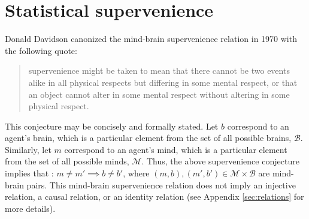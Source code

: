 \documentclass{article}
\newcommand{\mB}{\mathcal{B}}
\newcommand{\mM}{\mathcal{M}}
\providecommand{\mc}[1]{\mathcal{#1}}
\begin{document}


\section{Statistical supervenience} %
\label{sec:preliminaries}



Donald Davidson canonized the mind-brain supervenience relation in 1970 with the following quote: \cite{Davidson70}
\begin{quotation}
\noindent supervenience might be taken to mean that there cannot be two events alike in all physical respects but differing in some mental respect, or that an object cannot alter in some mental respect without altering in some physical respect.
\end{quotation}
This conjecture may be concisely and formally stated.  Let $b$ correspond to an agent's brain, which is a particular element from the set of all possible brains, $\mB$. %
Similarly, let $m$ correspond to an agent's mind, which is a particular element from the set of all possible minds, $\mM$.  %
Thus, the above supervenience conjecture implies that%
: $m \neq m' \implies b \neq b'$, where $(m,b), (m',b') \in \mc{M} \times \mc{B}$ are mind-brain pairs.  This mind-brain supervenience relation does not imply an injective relation, a causal relation, or an identity relation (see Appendix \ref{sec:relations} for more details).
\end{document}
